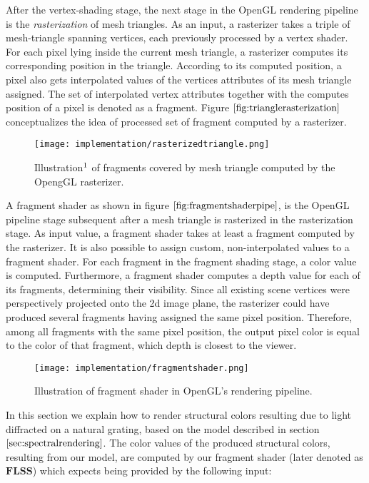 After the vertex-shading stage, the next stage in the OpenGL rendering pipeline is the \emph{rasterization} of mesh triangles. As an input, a rasterizer takes a triple of mesh-triangle spanning vertices, each previously processed by a vertex shader. For each pixel lying inside the current mesh triangle, a rasterizer computes its corresponding position in the triangle. According to its computed position, a pixel also gets interpolated values of the vertices attributes of its mesh triangle assigned. The set of interpolated vertex attributes together with the computes position of a pixel is denoted as a fragment. Figure $\ref{fig:trianglerasterization}$ conceptualizes the idea of processed set of fragment computed by a rasterizer.

\begin{figure}[H]
  \centering
  \texttt{[image: implementation/rasterizedtriangle.png]}
  \caption[Triangle Rasterization]{Illustration$\footnotemark$ of fragments covered by mesh triangle computed by the OpengGL rasterizer.}
  \label{fig:trianglerasterization}
\end{figure}

A fragment shader as shown in figure $\ref{fig:fragmentshaderpipe}$, is the OpenGL pipeline stage subsequent after a mesh triangle is rasterized in the rasterization stage. As input value, a fragment shader takes at least a fragment computed by the rasterizer. It is also possible to assign custom, non-interpolated values to a fragment shader. For each fragment in the fragment shading stage, a color value is computed. Furthermore, a fragment shader computes a depth value for each of its fragments, determining their visibility. Since all existing scene vertices were perspectively projected onto the 2d image plane, the rasterizer could have produced several fragments having assigned the same pixel position. Therefore, among all fragments with the same pixel position, the output pixel color is equal to the color of that fragment, which depth is closest to the viewer.

\begin{figure}[H]
  \centering
  \texttt{[image: implementation/fragmentshader.png]}
  \caption[Fragment Shader]{Illustration of fragment shader in OpenGL's rendering pipeline.}
  \label{fig:fragmentshaderpipe}
\end{figure}

\label{sec:flssshader}
\label{sec:inputlists}
In this section we explain how to render structural colors resulting due to light diffracted on a natural grating, based on the model described in section $\ref{sec:spectralrendering}$. The color values of the produced structural colors, resulting from our model, are computed by our fragment shader (later denoted as $\textbf{FLSS}$) which expects being provided by the following input:

